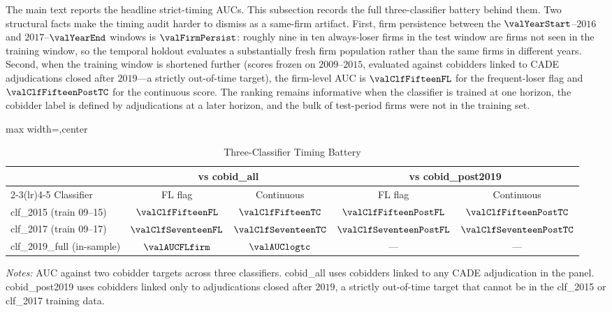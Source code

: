 The main text reports the headline strict-timing AUCs. This
subsection records the full three-classifier battery behind them.
Two structural facts make the timing audit harder to dismiss as a
same-firm artifact. First, firm persistence between the
$\valYearStart$--$2016$ and $2017$--$\valYearEnd$ windows is
$\valFirmPersist$: roughly nine in ten always-loser firms in the
test window are firms not seen in the training window, so the
temporal holdout evaluates a substantially fresh firm population
rather than the same firms in different years. Second, when the
training window is shortened further (scores frozen on
$2009$--$2015$, evaluated against cobidders linked to CADE
adjudications closed after $2019$---a strictly out-of-time
target), the firm-level AUC is $\valClfFifteenFL$ for the
frequent-loser flag and $\valClfFifteenPostTC$ for the continuous
score. The ranking remains informative when the classifier is
trained at one horizon, the cobidder label is defined by
adjudications at a later horizon, and the bulk of test-period
firms were not in the training set.

\begin{table}[htbp]
\centering
\caption{Three-Classifier Timing Battery}
\label{tab:three_classifier_submission}
\footnotesize
\begin{adjustbox}{max width=\textwidth,center}
\begin{threeparttable}
\begin{tabular}{p{4.0cm}cccc}
\toprule
& \multicolumn{2}{c}{vs cobid\_all} & \multicolumn{2}{c}{vs cobid\_post2019} \\
\cmidrule(lr){2-3}\cmidrule(lr){4-5}
Classifier & FL flag & Continuous & FL flag & Continuous \\
\midrule
clf\_2015 (train 09--15) & $\valClfFifteenFL$ & $\valClfFifteenTC$
  & $\valClfFifteenPostFL$ & $\valClfFifteenPostTC$ \\
clf\_2017 (train 09--17) & $\valClfSeventeenFL$ & $\valClfSeventeenTC$
  & $\valClfSeventeenPostFL$ & $\valClfSeventeenPostTC$ \\
clf\_2019\_full (in-sample) & $\valAUCFLfirm$ & $\valAUClogtc$
  & --- & --- \\
\bottomrule
\end{tabular}
\begin{tablenotes}
\footnotesize
\item \textit{Notes:} AUC against two cobidder targets across three
classifiers. cobid\_all uses cobidders linked to any CADE adjudication
in the panel. cobid\_post2019 uses cobidders linked only to
adjudications closed after $2019$, a strictly out-of-time target
that cannot be in the clf\_2015 or clf\_2017 training data.
\end{tablenotes}
\end{threeparttable}
\end{adjustbox}
\end{table}
